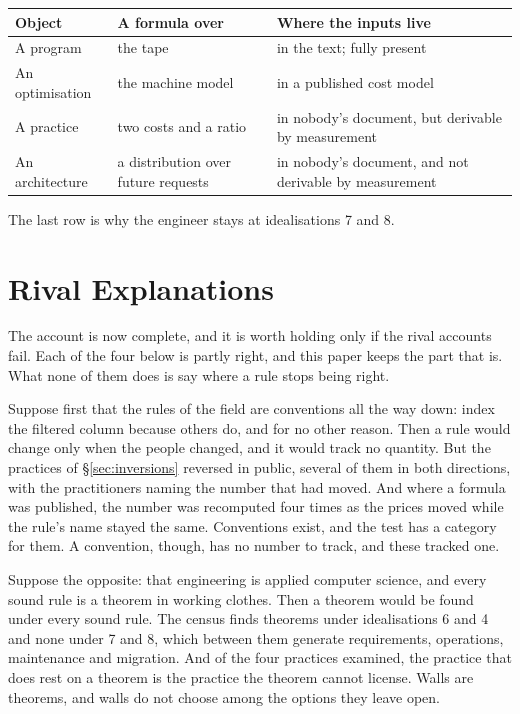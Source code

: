 \documentclass[11pt,oneside]{article}
\theoremstyle{definition}
\theoremstyle{remark}
\begin{document}
\begin{center}
\small
\begin{tabular}{@{}p{}p{}p{}@{}}
\toprule
\textbf{Object} & \textbf{A formula over} & \textbf{Where the inputs live} \\
\midrule
A program & the tape & in the text; fully present \\
An optimisation & the machine model & in a published cost model \\
A practice & two costs and a ratio & in nobody's document, but derivable by measurement \\
An architecture & a distribution over future requests & in nobody's document, and not
derivable by measurement \\
\bottomrule
\end{tabular}
\end{center}

The last row is why the engineer stays at idealisations 7 and 8.

\section{Rival Explanations}\label{sec:alternatives}
The account is now complete, and it is worth holding only if the rival accounts fail.
Each of the four below is partly right, and this paper keeps the part that is.
What none of them does is say where a rule stops being right.

Suppose first that the rules of the field are conventions all the way down: index the
filtered column because others do, and for no other reason. Then a rule would change only
when the people changed, and it would track no quantity. But the practices of
\S\ref{sec:inversions} reversed in public, several of them in both directions, with the
practitioners naming the number that had moved. And where a formula was published, the
number was recomputed four times as the prices moved while the rule's name stayed the
same. Conventions exist, and the test has a category for them. A convention, though, has
no number to track, and these tracked one.

Suppose the opposite: that engineering is applied computer science, and every sound rule
is a theorem in working clothes. Then a theorem would be found under every sound rule. The
census finds theorems under idealisations 6 and 4 and none under 7 and 8, which between
them generate requirements, operations, maintenance and migration. And of the four
practices examined, the practice that does rest on a theorem is the practice the theorem cannot
license. Walls are
theorems, and walls do not choose among the options they leave open.
\end{document}

